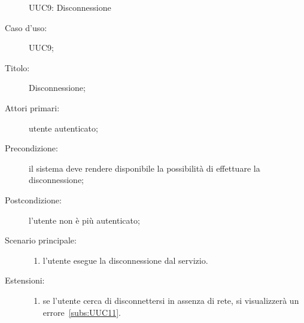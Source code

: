 \documentclass[../../../analisi-dei-requisiti.tex]{subfiles}
\begin{document}
\begin{figure}[H]
  \centering
  \caption{UUC9: Disconnessione}%
  \label{fig:UUC9}
\end{figure}

\begin{description}
  \item[Caso d’uso:] UUC9;
  \item[Titolo:] Disconnessione;
  \item[Attori primari:] utente autenticato;
  \item[Precondizione:] il sistema deve rendere disponibile la possibilità di effettuare la disconnessione;
  \item[Postcondizione:] l'utente non è più autenticato;
  \item[Scenario principale:]
        \begin{enumerate}
          \item l'utente esegue la disconnessione dal servizio.
        \end{enumerate}
  \item[Estensioni:]
        \begin{enumerate}
          \item se l'utente cerca di disconnettersi in assenza di rete, si visualizzerà un errore~\ref{subs:UUC11}.
        \end{enumerate}
\end{description}
\end{document}
